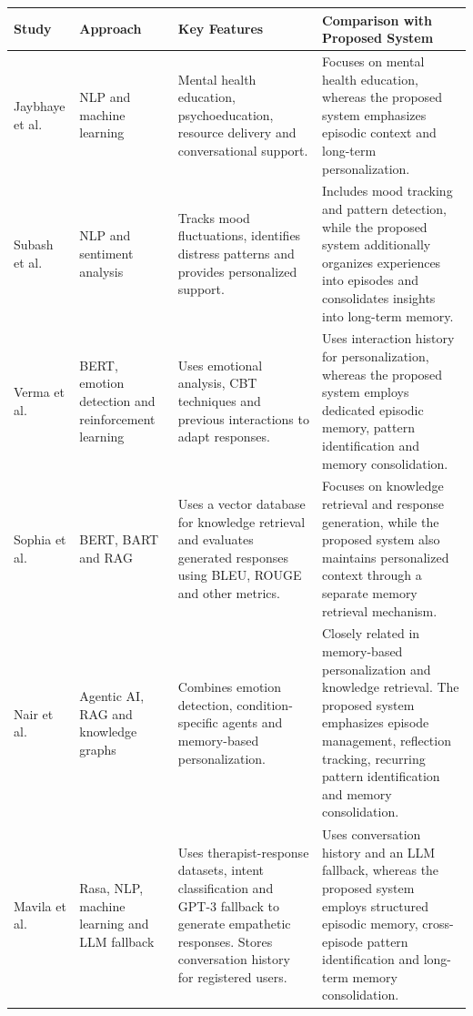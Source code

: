 \documentclass[conference]{IEEEtran}
\begin{document}
\begin{table}[!t]
\centering
\renewcommand{\arraystretch}{1.5}
\begin{tabular}{|m{2.8cm}|m{3.1cm}|m{4.2cm}|m{5cm}|}
\hline
\centering\arraybackslash\textbf{Study} &
\centering\arraybackslash\textbf{Approach} &
\centering\arraybackslash\textbf{Key Features} &
\centering\arraybackslash\textbf{Comparison with Proposed System} \\
\hline

Jaybhaye et al. \cite{b2} &
NLP and machine learning &
Mental health education, psychoeducation, resource delivery and conversational support. &
Focuses on mental health education, whereas the proposed system emphasizes episodic context and long-term personalization. \\
\hline

Subash et al. \cite{b3} &
NLP and sentiment analysis &
Tracks mood fluctuations, identifies distress patterns and provides personalized support. &
Includes mood tracking and pattern detection, while the proposed system additionally organizes experiences into episodes and consolidates insights into long-term memory. \\
\hline

Verma et al. \cite{b4} &
BERT, emotion detection and reinforcement learning &
Uses emotional analysis, CBT techniques and previous interactions to adapt responses. &
Uses interaction history for personalization, whereas the proposed system employs dedicated episodic memory, pattern identification and memory consolidation. \\
\hline

Sophia et al. \cite{b5} &
BERT, BART and RAG &
Uses a vector database for knowledge retrieval and evaluates generated responses using BLEU, ROUGE and other metrics. &
Focuses on knowledge retrieval and response generation, while the proposed system also maintains personalized context through a separate memory retrieval mechanism. \\
\hline

Nair et al. \cite{b6} &
Agentic AI, RAG and knowledge graphs &
Combines emotion detection, condition-specific agents and memory-based personalization. &
Closely related in memory-based personalization and knowledge retrieval. The proposed system emphasizes episode management, reflection tracking, recurring pattern identification and memory consolidation. \\
\hline

Mavila et al. \cite{b8} &
Rasa, NLP, machine learning and LLM fallback &
Uses therapist-response datasets, intent classification and GPT-3 fallback to generate empathetic responses. Stores conversation history for registered users. &
Uses conversation history and an LLM fallback, whereas the proposed system employs structured episodic memory, cross-episode pattern identification and long-term memory consolidation. \\
\hline


\end{tabular}
\end{table}
\end{document}
